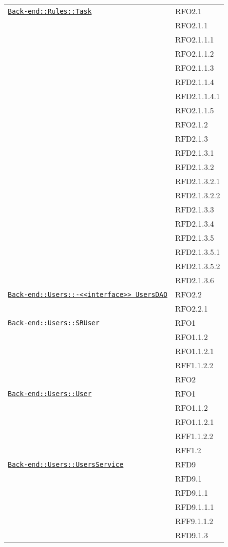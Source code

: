 \begin{longtable}{|>{\centering}m{10cm}|m{3cm}<{\centering}|}
\hyperref[Back-end::Rules::Task]{\texttt{Back-end::Rules::Task}} & RFO2.1\\
& RFO2.1.1\\
& RFO2.1.1.1\\
& RFO2.1.1.2\\
& RFO2.1.1.3\\
& RFD2.1.1.4\\
& RFD2.1.1.4.1\\
& RFO2.1.1.5\\
& RFO2.1.2\\
& RFD2.1.3\\
& RFD2.1.3.1\\
& RFD2.1.3.2\\
& RFD2.1.3.2.1\\
& RFD2.1.3.2.2\\
& RFD2.1.3.3\\
& RFD2.1.3.4\\
& RFD2.1.3.5\\
& RFD2.1.3.5.1\\
& RFD2.1.3.5.2\\
& RFD2.1.3.6\\ \hline

\hyperref[Back-end::Users::<<interface>> UsersDAO]{\texttt{Back-end::Users::-\linebreak <<interface>> UsersDAO}} & RFO2.2\\
& RFO2.2.1\\ \hline

\hyperref[Back-end::Users::SRUser]{\texttt{Back-end::Users::SRUser}} & RFO1\\
& RFO1.1.2\\
& RFO1.1.2.1\\
& RFF1.1.2.2\\
& RFO2\\ \hline

\hyperref[Back-end::Users::User]{\texttt{Back-end::Users::User}} & RFO1\\
& RFO1.1.2\\
& RFO1.1.2.1\\
& RFF1.1.2.2\\
& RFF1.2\\ \hline

\hyperref[Back-end::Users::UsersService]{\texttt{Back-end::Users::UsersService}} & RFD9\\
& RFD9.1\\
& RFD9.1.1\\
& RFD9.1.1.1\\
& RFF9.1.1.2\\
& RFD9.1.3\\ \hline


\end{longtable}
